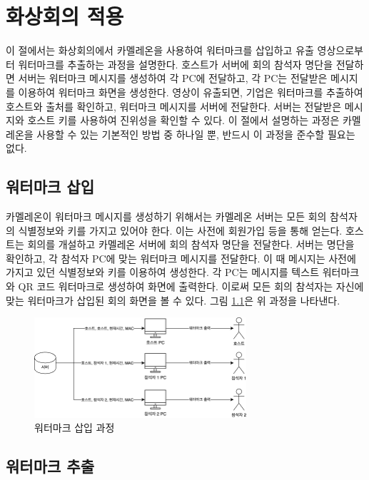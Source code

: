 \chapter{화상회의 적용}

이 절에서는 화상회의에서 카멜레온을 사용하여 워터마크를 삽입하고 유출
영상으로부터 워터마크를 추출하는 과정을 설명한다. 호스트가 서버에 회의 참석자
명단을 전달하면 서버는 워터마크 메시지를 생성하여 각 PC에 전달하고, 각 PC는
전달받은 메시지를 이용하여 워터마크 화면을 생성한다. 영상이 유출되면, 기업은
워터마크를 추출하여 호스트와 출처를 확인하고, 워터마크 메시지를 서버에 전달한다.
서버는 전달받은 메시지와 호스트 키를 사용하여 진위성을 확인할 수 있다. 이 절에서
설명하는 과정은 카멜레온을 사용할 수 있는 기본적인 방법 중 하나일 뿐, 반드시 이
과정을 준수할 필요는 없다.

\section{워터마크 삽입}

카멜레온이 워터마크 메시지를 생성하기 위해서는 카멜레온 서버는 모든 회의
참석자의 식별정보와 키를 가지고 있어야 한다. 이는 사전에 회원가입 등을 통해
얻는다. 호스트는 회의를 개설하고 카멜레온 서버에 회의 참석자 명단을 전달한다.
서버는 명단을 확인하고, 각 참석자 PC에 맞는 워터마크 메시지를 전달한다. 이 때
메시지는 사전에 가지고 있던 식별정보와 키를 이용하여 생성한다. 각 PC는 메시지를
텍스트 워터마크와 QR 코드 워터마크로 생성하여 화면에 출력한다. 이로써 모든 회의
참석자는 자신에 맞는 워터마크가 삽입된 회의 화면을 볼 수 있다. 그림
\ref{fig:wm_encoding}은 위 과정을 나타낸다.
\begin{figure}[ht]
    \vspace{10pt}
    \centering
    \includegraphics[width=0.7\textwidth]{imgs/wm_encoding.png}
    \caption{워터마크 삽입 과정}
    \label{fig:wm_encoding}
\end{figure}

\section{워터마크 추출}

